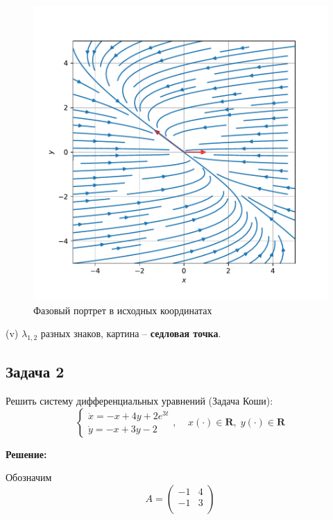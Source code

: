 \documentclass[a4paper, 12pt]{article}
\begin{document}
\begin{figure}[H]
	\centering
	\includegraphics[scale=0.7]{1a1_1}
	\caption{Фазовый портрет в исходных координатах}
	\label{im:1a1_1}
\end{figure}

(v) $\lambda_{1,2}$ разных знаков, картина -- \textbf{седловая точка}.







	\subsection {Задача 2}
 Решить систему дифференциальных уравнений (Задача Коши): 
\begin{equation}
\left\{
\begin{array}{lr}
\dot{x} = -x+4y+2e^{3t}\\
\dot{y} = -x+3y-2
\end{array}
\right.
, \;\;\;\; x(\cdot)\in \textbf{R},\; y(\cdot)\in \textbf{R}
\label{eq:2}
\end{equation}

\textbf{Решение:} \par
Обозначим 
\[
A = \left(
\begin{array}{cc}
-1 & 4\\
-1 & 3\\
\end{array}
\right)\]
\end{document}
